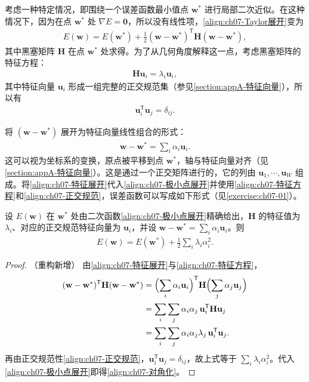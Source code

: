 \documentclass[../../main.tex]{subfiles}
\begin{document}
考虑一种特定情况，即围绕一个误差函数最小值点 $\mathbf{w}^{\ast}$ 进行局部二次近似。在这种情况下，因为在点 $\mathbf{w}^{\ast}$ 处 $\nabla E=\mathbf{0}$，所以没有线性项，\eqref{align:ch07-Taylor展开}变为
\begin{align}
E(\mathbf{w}) = E(\mathbf{w}^{\ast})+\frac{1}{2}(\mathbf{w}-\mathbf{w}^{\ast})^{\mathsf T}\mathbf{H}(\mathbf{w}-\mathbf{w}^{\ast}),
\label{align:ch07-极小点展开}
\end{align}
其中黑塞矩阵 $\mathbf{H}$ 在点 $\mathbf{w}^{\ast}$ 处求得。为了从几何角度解释这一点，考虑黑塞矩阵的特征方程：
\begin{align}
\mathbf{H}\mathbf{u}_i = \lambda_i\mathbf{u}_i,
\label{align:ch07-特征方程}
\end{align}
其中特征向量 $\mathbf{u}_i$ 形成一组完整的正交规范集（参见\cref{section:appA-特征向量}），所以有
\begin{align}
\mathbf{u}_i^{\mathsf T}\mathbf{u}_j = \delta_{ij}.
\label{align:ch07-正交规范}
\end{align}

将 $(\mathbf{w}-\mathbf{w}^{\ast})$ 展开为特征向量线性组合的形式：
\begin{align}
\mathbf{w}-\mathbf{w}^{\ast} = \sum_i \alpha_i\mathbf{u}_i.
\label{align:ch07-特征展开}
\end{align}
这可以视为坐标系的变换，原点被平移到点 $\mathbf{w}^{\ast}$，轴与特征向量对齐（见\cref{section:appA-特征向量}）。这是通过一个正交矩阵进行的，它的列由 $\mathbf{u}_1,\cdots,\mathbf{u}_W$ 组成。将\eqref{align:ch07-特征展开}代入\eqref{align:ch07-极小点展开}并使用\eqref{align:ch07-特征方程}和\eqref{align:ch07-正交规范}，误差函数可以写成如下形式（见\cref{exercise:ch07-01}）。

\begin{proposition}[特征向量坐标下的误差函数]\label{proposition:ch07-特征分解}
设 $E(\mathbf{w})$ 在 $\mathbf{w}^{\ast}$ 处由二次函数\eqref{align:ch07-极小点展开}精确给出，$\mathbf{H}$ 的特征值为 $\lambda_i$、对应的正交规范特征向量为 $\mathbf{u}_i$，并设 $\mathbf{w}-\mathbf{w}^{\ast}=\sum_i\alpha_i\mathbf{u}_i$。则
\begin{align}
E(\mathbf{w}) = E(\mathbf{w}^{\ast})+\frac{1}{2}\sum_i\lambda_i\alpha_i^{2}.
\label{align:ch07-对角化}
\end{align}
\end{proposition}
\begin{proof}（重构新增）
由\eqref{align:ch07-特征展开}与\eqref{align:ch07-特征方程}，
\begin{align*}
(\mathbf{w}-\mathbf{w}^{\ast})^{\mathsf T}\mathbf{H}(\mathbf{w}-\mathbf{w}^{\ast})
&= \Bigl(\sum_i\alpha_i\mathbf{u}_i\Bigr)^{\mathsf T}\mathbf{H}\Bigl(\sum_j\alpha_j\mathbf{u}_j\Bigr)\\
&= \sum_i\sum_j\alpha_i\alpha_j\,\mathbf{u}_i^{\mathsf T}\mathbf{H}\mathbf{u}_j\\
&= \sum_i\sum_j\alpha_i\alpha_j\lambda_j\,\mathbf{u}_i^{\mathsf T}\mathbf{u}_j.
\end{align*}
再由正交规范性\eqref{align:ch07-正交规范}，$\mathbf{u}_i^{\mathsf T}\mathbf{u}_j=\delta_{ij}$，故上式等于 $\sum_i\lambda_i\alpha_i^{2}$。代入\eqref{align:ch07-极小点展开}即得\eqref{align:ch07-对角化}。
\end{proof}
\end{document}
